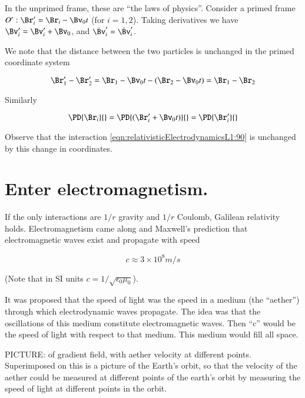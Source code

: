 In the unprimed frame, these are ``the laws of physics''.  Consider a primed frame $O' : \Br_i' = \Br_i - \Bv_0 t$ (for $i=1,2$).  Taking derivatives we have $\Bv_i' = \Bv_i' + \Bv_0$, and $\dot{\Bv}_i' = \dot{\Bv}_i'$.

We note that the distance between the two particles is unchanged in the primed coordinate system

\begin{equation}\label{eqn:relativisticElectrodynamicsL1:100}
\Br_1' - \Br_2' = \Br_1 - \Bv_0 t -( \Br_2 - \Bv_0 t ) = \Br_1 - \Br_2
\end{equation}

Similarly 

\begin{equation}\label{eqn:relativisticElectrodynamicsL1:110}
\PD{\Br_i}{} = \PD{(\Br_i' + \Bv_0 t)}{} = \PD{\Br_i'}{}
\end{equation}

Observe that the interaction \ref{eqn:relativisticElectrodynamicsL1:90} is unchanged by this change in coordinates.

\section{Enter electromagnetism.}


If the only interactions are $1/r$ gravity and $1/r$ Coulomb, Galilean relativity holds.  Electromagnetism came along and Maxwell's prediction that electromagnetic waves exist and propagate with speed

\begin{equation}\label{eqn:relativisticElectrodynamicsL1:200}
c \approx 3 \times 10^8 m/s
\end{equation}

(Note that in SI units $c = 1/\sqrt{ \epsilon_0 \mu_0 }$).

It was proposed that the speed of light was the speed in a medium (the ``aether'') through which electrodynamic waves propagate.  The idea was that the oscillations of this medium constitute electromagnetic waves.  Then ``c'' would be the speed of light with respect to that medium.  This medium would fill all space.

PICTURE: of gradient field, with aether velocity at different points.  Superimposed on this is a picture of the Earth's orbit, so that the velocity of the aether could be measured at different points of the earth's orbit by measuring the speed of light at different points in the orbit.

